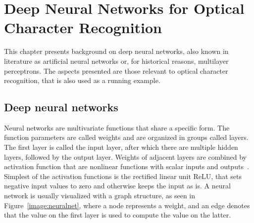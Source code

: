 \documentclass[english,twoside,openright]{UH_DS_MSc}
\begin{document}
\chapter{Deep Neural Networks for Optical Character Recognition}


This chapter presents background on deep neural networks, also known 
in literature as artificial neural networks or, for historical reasons, multilayer perceptrons.
The aspects presented are those relevant to optical character recognition,
that is also used as a running example.

\section{Deep neural networks}


Neural networks are multivariate functions that share a specific form.
The function parameters are called weights and are organized in groups called layers.
The first layer is called the input layer, after which there are multiple hidden layers, followed by the output layer.
Weights of adjacent layers are combined by activation function that are nonlinear functions with 
scalar inputs and outputs~\cite{princebook}. Simplest of the activation functions is the rectified
linear unit ReLU, that sets negative input values to zero and otherwise keeps the input as is. A neural network is usually visualized with a graph structure, as seen in Figure~\ref{image:neuralnet}, where a node represents a 
weight, and an edge denotes that the value on the first layer is used to compute the value on the latter.
\end{document}
